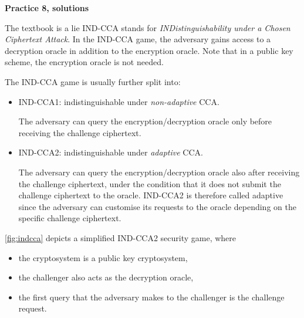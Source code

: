 \documentclass{practice}
\begin{document}
\begin{center}
  \textbf{Practice 8, solutions}
\end{center}

\begin{task}{The textbook is a lie}
  IND-CCA stands for \emph{INDistinguishability under a Chosen Ciphertext Attack}.
  In the IND-CCA game, the adversary gains access to a decryption oracle in addition to the encryption oracle.
  Note that in a public key scheme, the encryption oracle is not needed.

  The IND-CCA game is usually further split into:
  \begin{itemize}
    \item IND-CCA1: indistinguishable under \emph{non-adaptive} CCA.
    
    The adversary can query the encryption/decryption oracle only before receiving the challenge ciphertext.

    \item IND-CCA2: indistinguishable under \emph{adaptive} CCA.
    
    The adversary can query the encryption/decryption oracle also after receiving the challenge ciphertext, under the condition that it does not submit the challenge ciphertext to the oracle.
    IND-CCA2 is therefore called adaptive since the adversary can customise its requests to the oracle depending on the specific challenge ciphertext.
  \end{itemize}

  \autoref{fig:indcca} depicts a simplified IND-CCA2 security game, where
  \begin{itemize}
    \item the cryptosystem is a public key cryptosystem,
    \item the challenger also acts as the decryption oracle,
    \item the first query that the adversary makes to the challenger is the challenge request.
  \end{itemize}

  \begin{figure}[h!]
    \centering
\end{figure}
\end{task}
\end{document}
